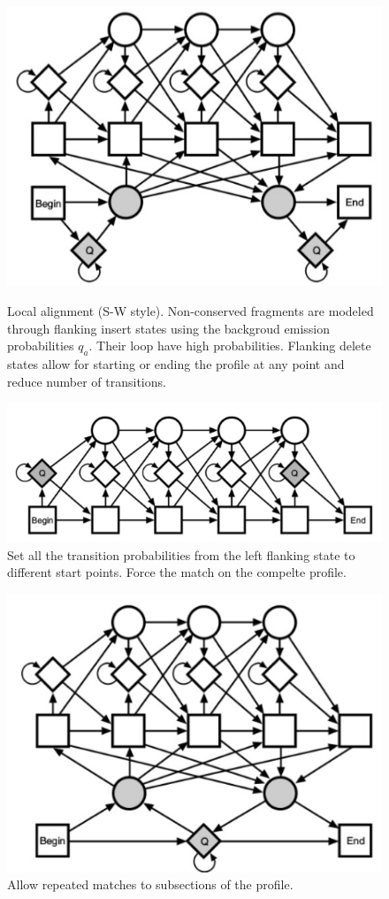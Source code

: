 \begin{figure}[H]
\begin{adjustwidth}{-2cm}{}
\centering
\begin{minipage}{.47\linewidth}
  \centering
  \includegraphics[scale=0.5]{images/46_nglobal.png}
  \caption{Local alignment (S-W style). Non-conserved fragments are modeled through flanking insert states using the backgroud emission probabilities $q_a$. Their loop have high probabilities. Flanking delete states allow for starting or ending the profile at any point and reduce number of transitions.}
\end{minipage}%
\hspace{0.5cm}
\begin{minipage}{.47\linewidth}
  \centering
  \includegraphics[scale=0.5]{images/47_nglobal.png}
  \caption{Set all the transition probabilities from the left flanking state to different start points. Force the match on the compelte profile.}
\end{minipage}
\end{adjustwidth}
\end{figure}

\begin{figure}[htp]
	\centering
	\includegraphics[scale=0.5]{images/48_nglobal.png}
	\caption{Allow repeated matches to subsections of the profile.}
\end{figure}


